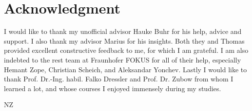 
\cleardoublepage
{}
\section*{Acknowledgment}

I would like to thank my unofficial advisor Hauke Buhr for his help, advice and support. I also thank my advisor Marius for his insights. Both they and Thomas provided excellent constructive feedback to me, for which I am grateful. I am also indebted to the rest team at Fraunhofer FOKUS for all of their help, especially Hemant Zope, Christian Scheich, and Aleksandar Yonchev. Lastly I would like to thank Prof. Dr.-Ing. habil. Falko Dressler and Prof. Dr. Zubow from whom I learned a lot, and whose courses I enjoyed immensely during my studies.

\begin{flushright}
NZ\\[1pc]
\end{flushright}
